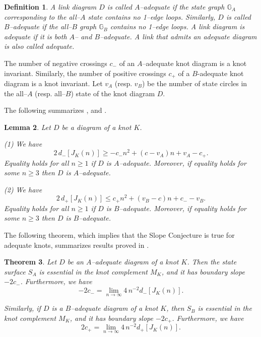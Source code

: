 \documentclass[11pt]{amsart}
\newtheorem{theorem}{Theorem}[section]
\newtheorem{lemma}[theorem]{Lemma}
\newtheorem{define}[theorem]{Definition}
\theoremstyle{definition}
\newcommand{\GA}{{\mathbb{G}_A}}
\newcommand{\GB}{{\mathbb{G}_B}}
\begin{document}
\begin{define}\label{defi:adequate}
A link diagram $D$ is called \emph{$A$--adequate} if the state graph
$\GA$ corresponding to the all--$A$ state contains no 1--edge loops.
Similarly, $D$ is called \emph{$B$--adequate} if the all--$B$ graph $\GB$
contains no 1--edge loops.  A link diagram 
is \emph{adequate} if it is
both $A$-- and $B$--adequate.  A link that admits an adequate diagram
is also called \emph{adequate}.
\end{define}

The number of negative crossings  $c_-$  of an $A$--adequate knot diagram is a knot invariant.
Similarly, the number of positive crossings $c_+$ of  a  $B$-adequate knot diagram is a knot invariant.
Let $v_A$ (resp. $v_B$) be the number of state circles in the all--$A$ (resp. all--$B$) state of the knot diagram $D$.

The following summarizes \cite[Lemma 5.4]{Li}, \cite[Proposition 2.1]{Le06} and \cite[Theorem 3.1]{KL}.

\begin{lemma} 
\label{degLe}
Let $D$ be a diagram of a knot $K$.

(1) We have
$$2 \, d_-[J_{K}(n)] \ge  -c_- n^2 + (c -v_A) n  + v_A - c_+.$$
Equality holds for all $n \ge 1$ if $D$ is $A$--adequate. Moreover, if equality holds for some $n \ge 3$ then $D$ is $A$--adequate.

(2) We have
$$
2 \, d_+[J_{K}(n)] \le c_+ n^2 + (v_B - c) n + c_- - v_B.
$$
Equality holds for all $n \ge 1$ if $D$ is $B$--adequate. Moreover, if equality holds for some $n \ge 3$ then $D$ is $B$--adequate.
\end{lemma}



The following theorem, which implies that the Slope Conjecture is true for adequate knots, summarizes results proved in   \cite{FKP, FKP-guts}.

\begin{theorem}\label{thm:essential} 
Let $D$ be an $A$--adequate diagram of a knot $K$. Then the state
surface $S_A$ is essential  in the knot
complement $M_K$, and it  has boundary slope $-2c_-$. Furthermore, we have
$$-2c_- = \lim_{n \to \infty} 4\, n^{-2}d_-[J_K(n)].$$

Similarly, if $D$ is a $B$--adequate diagram of a
knot $K$, then $S_B$ is essential in the knot 
complement $M_K$, and it  has boundary slope $-2c_+$.
 Furthermore, we have
$$2c_+ =  \lim_{n \to \infty} 4\, n^{-2}d_+[J_K(n)].$$
\end{theorem}
\end{document}
